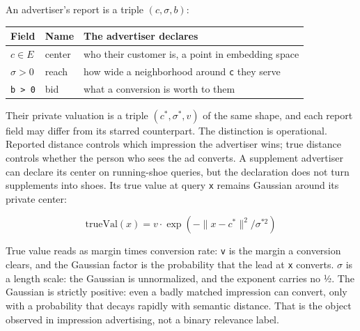 An advertiser's report is a triple \((c, \sigma , b)\):

{\def\LTcaptype{none} %
\begin{longtable}[]{@{}
  >{\raggedright\arraybackslash}p{}
  >{\raggedright\arraybackslash}p{}
  >{\raggedright\arraybackslash}p{}@{}}
\toprule\noalign{}
\begin{minipage}[b]{\linewidth}\raggedright
Field
\end{minipage} & \begin{minipage}[b]{\linewidth}\raggedright
Name
\end{minipage} & \begin{minipage}[b]{\linewidth}\raggedright
The advertiser declares
\end{minipage} \\
\midrule\noalign{}
\endhead
\bottomrule\noalign{}
\endlastfoot
\(c \in  E\) & center & who their customer is, a point in embedding
space \\
\(\sigma  > 0\) & reach & how wide a neighborhood around \texttt{c} they
serve \\
\texttt{b\ \textgreater{}\ 0} & bid & what a conversion is worth to
them \\
\end{longtable}
}

Their private valuation is a triple \((c^{*}, \sigma ^{*}, v)\) of the
same shape, and each report field may differ from its starred
counterpart. The distinction is operational. Reported distance controls
which impression the advertiser wins; true distance controls whether the
person who sees the ad converts. A supplement advertiser can declare its
center on running-shoe queries, but the declaration does not turn
supplements into shoes. Its true value at query \texttt{x} remains
Gaussian around its private center:

\[\mathrm{trueVal}(x) = v \cdot  \exp(-\|x - c^{*}\|^{2} / \sigma ^{*2})\]

True value reads as margin times conversion rate: \texttt{v} is the
margin a conversion clears, and the Gaussian factor is the probability
that the lead at \texttt{x} converts. \(\sigma\) is a length scale: the
Gaussian is unnormalized, and the exponent carries no ½. The Gaussian is
strictly positive: even a badly matched impression can convert, only
with a probability that decays rapidly with semantic distance. That is
the object observed in impression advertising, not a binary relevance
label.

